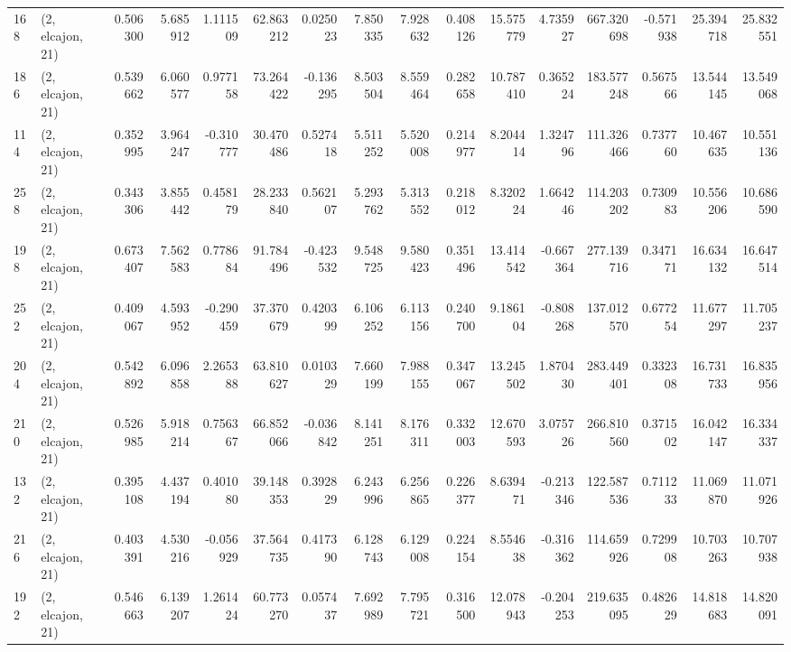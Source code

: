 \begin{tabular}{llrrrrrrrrrrrrrr}
168 &  (2, elcajon, 21) &   0.506300 &   5.685912 &   1.111509 &    62.863212 &   0.025023 &   7.850335 &   7.928632 &  0.408126 &  15.575779 &   4.735927 &   667.320698 & -0.571938 &  25.394718 &  25.832551 \\
186 &  (2, elcajon, 21) &   0.539662 &   6.060577 &   0.977158 &    73.264422 &  -0.136295 &   8.503504 &   8.559464 &  0.282658 &  10.787410 &   0.365224 &   183.577248 &  0.567566 &  13.544145 &  13.549068 \\
114 &  (2, elcajon, 21) &   0.352995 &   3.964247 &  -0.310777 &    30.470486 &   0.527418 &   5.511252 &   5.520008 &  0.214977 &   8.204414 &   1.324796 &   111.326466 &  0.737760 &  10.467635 &  10.551136 \\
258 &  (2, elcajon, 21) &   0.343306 &   3.855442 &   0.458179 &    28.233840 &   0.562107 &   5.293762 &   5.313552 &  0.218012 &   8.320224 &   1.664246 &   114.203202 &  0.730983 &  10.556206 &  10.686590 \\
198 &  (2, elcajon, 21) &   0.673407 &   7.562583 &   0.778684 &    91.784496 &  -0.423532 &   9.548725 &   9.580423 &  0.351496 &  13.414542 &  -0.667364 &   277.139716 &  0.347171 &  16.634132 &  16.647514 \\
252 &  (2, elcajon, 21) &   0.409067 &   4.593952 &  -0.290459 &    37.370679 &   0.420399 &   6.106252 &   6.113156 &  0.240700 &   9.186104 &  -0.808268 &   137.012570 &  0.677254 &  11.677297 &  11.705237 \\
204 &  (2, elcajon, 21) &   0.542892 &   6.096858 &   2.265388 &    63.810627 &   0.010329 &   7.660199 &   7.988155 &  0.347067 &  13.245502 &   1.870430 &   283.449401 &  0.332308 &  16.731733 &  16.835956 \\
210 &  (2, elcajon, 21) &   0.526985 &   5.918214 &   0.756367 &    66.852066 &  -0.036842 &   8.141251 &   8.176311 &  0.332003 &  12.670593 &   3.075726 &   266.810560 &  0.371502 &  16.042147 &  16.334337 \\
132 &  (2, elcajon, 21) &   0.395108 &   4.437194 &   0.401080 &    39.148353 &   0.392829 &   6.243996 &   6.256865 &  0.226377 &   8.639471 &  -0.213346 &   122.587536 &  0.711233 &  11.069870 &  11.071926 \\
216 &  (2, elcajon, 21) &   0.403391 &   4.530216 &  -0.056929 &    37.564735 &   0.417390 &   6.128743 &   6.129008 &  0.224154 &   8.554638 &  -0.316362 &   114.659926 &  0.729908 &  10.703263 &  10.707938 \\
192 &  (2, elcajon, 21) &   0.546663 &   6.139207 &   1.261424 &    60.773270 &   0.057437 &   7.692989 &   7.795721 &  0.316500 &  12.078943 &  -0.204253 &   219.635095 &  0.482629 &  14.818683 &  14.820091 \\

\end{tabular}
